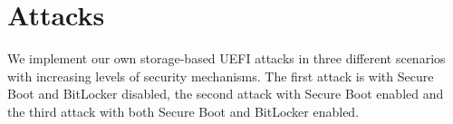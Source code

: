 
\chapter{Attacks}

We implement our own storage-based \ac{UEFI} attacks in three different scenarios with increasing levels of security mechanisms.
The first attack is with Secure Boot and BitLocker disabled, the second attack with Secure Boot enabled and the third attack with both Secure Boot and BitLocker enabled.



